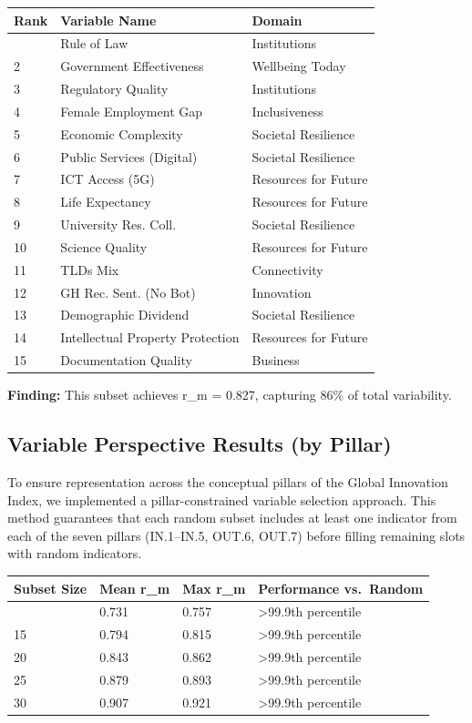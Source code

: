\documentclass[
  letterpaper,
  DIV=11,
  numbers=noendperiod]{scrartcl}
\newcounter{none} %
\begin{document}
{\def\LTcaptype{none} %
\begin{longtable}[]{@{}lll@{}}
\toprule\noalign{}
Rank & Variable Name & Domain \\
\midrule\noalign{}
\endhead
\bottomrule\noalign{}
\endlastfoot
1 & Rule of Law & Institutions \\
2 & Government Effectiveness & Wellbeing Today \\
3 & Regulatory Quality & Institutions \\
4 & Female Employment Gap & Inclusiveness \\
5 & Economic Complexity & Societal Resilience \\
6 & Public Services (Digital) & Societal Resilience \\
7 & ICT Access (5G) & Resources for Future \\
8 & Life Expectancy & Resources for Future \\
9 & University Res. Coll. & Societal Resilience \\
10 & Science Quality & Resources for Future \\
11 & TLDs Mix & Connectivity \\
12 & GH Rec. Sent. (No Bot) & Innovation \\
13 & Demographic Dividend & Societal Resilience \\
14 & Intellectual Property Protection & Resources for Future \\
15 & Documentation Quality & Business \\
\end{longtable}
}

\textbf{Finding:} This subset achieves r\_m = 0.827, capturing 86\% of
total variability.

\subsection{Variable Perspective Results (by
Pillar)}\label{variable-perspective-results-by-pillar}

To ensure representation across the conceptual pillars of the Global
Innovation Index, we implemented a pillar-constrained variable selection
approach. This method guarantees that each random subset includes at
least one indicator from each of the seven pillars (IN.1--IN.5, OUT.6,
OUT.7) before filling remaining slots with random indicators.

{\def\LTcaptype{none} %
\begin{longtable}[]{@{}llll@{}}
\toprule\noalign{}
Subset Size & Mean r\_m & Max r\_m & Performance vs.~Random \\
\midrule\noalign{}
\endhead
\bottomrule\noalign{}
\endlastfoot
10 & 0.731 & 0.757 & \textgreater99.9th percentile \\
15 & 0.794 & 0.815 & \textgreater99.9th percentile \\
20 & 0.843 & 0.862 & \textgreater99.9th percentile \\
25 & 0.879 & 0.893 & \textgreater99.9th percentile \\
30 & 0.907 & 0.921 & \textgreater99.9th percentile \\
\end{longtable}
}
\end{document}
